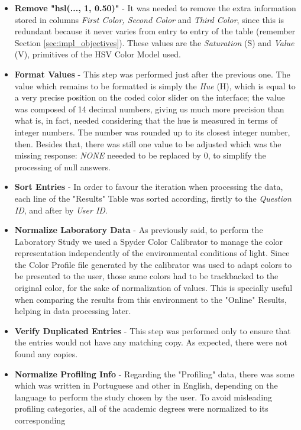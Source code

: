 \begin{itemize}
  \item \textbf{Remove "hsl(..., 1, 0.50)"} - It was needed to remove the extra information stored in columns \emph{First Color, Second Color}
   and \emph{Third Color}, since this is redundant because it never varies from entry to entry of the table (remember Section \ref{sec:impl_objectives}).
   These values are the \emph{Saturation} (S) and \emph{Value} (V), primitives of the HSV Color Model used.
  \item \textbf{Format Values} - This step was performed just after the previous one. The value which remains to be formatted is simply the \emph{Hue} (H),
  which is equal to a very precise position on the coded color slider on the interface; the value was composed of 14 decimal numbers, giving us much more
  precision than what is, in fact, needed considering that the hue is measured in terms of integer numbers. The number was rounded up to its closest
  integer number, then. Besides that, there was still one value to be adjusted which was the missing response: \emph{NONE} neeeded to be
  replaced by 0, to simplify the processing of null answers.
  \item \textbf{Sort Entries} - In order to favour the iteration when processing the data, each line of the "Results" Table was
  sorted according, firstly to the \emph{Question ID}, and after by \emph{User ID}.
  \item \textbf{Normalize Laboratory Data} - As previously said, to perform the Laboratory Study we used a Spyder Color Calibrator to manage the color
  representation independently of the environmental conditions of light. Since the Color Profile file generated by the calibrator was used to adapt colors
  to be presented to the user, those same colors had to be trackbacked to the original color, for the sake of normalization of values. This is
  specially useful when comparing the results from this environment to the "Online" Results, helping in data processing later.
  \item \textbf{Verify Duplicated Entries} - This step was performed only to ensure that the entries would not have any matching copy. As expected,
  there were not found any copies.
  \item \textbf{Normalize Profiling Info} - Regarding the "Profiling" data, there was some which was written in Portuguese and other in English, depending on
  the language to perform the study chosen by the user. To avoid misleading profiling categories, all of the academic degrees were normalized to its corresponding

\end{itemize}
